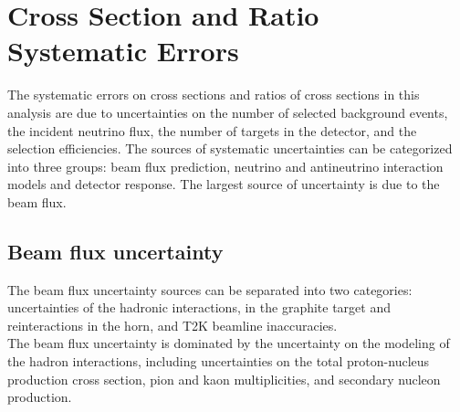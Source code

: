 \section{Cross Section and Ratio Systematic Errors}
The systematic errors on cross sections and ratios of cross sections 
in this analysis are due to 
uncertainties on the number of selected background events, the incident 
neutrino flux, the number of targets in the detector, and the selection efficiencies. 
The sources of systematic uncertainties can be categorized into three groups:
beam flux prediction, 
neutrino and antineutrino interaction models 
and detector response.
The largest source of uncertainty is due to the beam flux.

\subsection{Beam flux uncertainty}
The beam flux uncertainty sources can be separated
into two categories: uncertainties 
of the hadronic interactions, in the graphite target and reinteractions in the
horn, and
T2K beamline inaccuracies. \\

The beam flux uncertainty is dominated by the
uncertainty on the modeling of the hadron interactions, including
uncertainties on the total proton-nucleus production cross
section, pion and kaon multiplicities, and secondary nucleon production. \\

